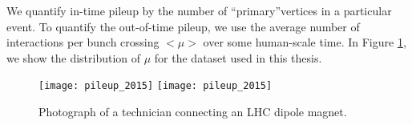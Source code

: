 We quantify in-time pileup by the number of ``primary''\footnotemark vertices in a particular event.
To quantify the out-of-time pileup, we use the average number of interactions per bunch crossing $<\mu>$ over some human-scale time.
In Figure \ref{fig:pileup}, we show the distribution of $\mu$ for the dataset used in this thesis.
\begin{figure}
\caption{Photograph of a technician connecting an LHC dipole magnet.}\label{fig:pileup}
\texttt{[image: pileup\_2015]}
\texttt{[image: pileup\_2015]}
\end{figure}

